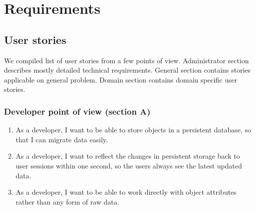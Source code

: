 \chapter{Requirements}
\section{User stories}
We compiled list of user stories from a few points of view. Administrator section describes mostly detailed technical requirements. General section contains stories applicable on general problem. Domain section contains domain specific user stories.

\subsection{Developer point of view (section A)}
\begin{enumerate}
  \item As a developer, I want to be able to store objects in a persistent database, so that I can migrate data easily.
  \item As a developer, I want to reflect the changes in persistent storage back to user sessions within one second, so the users always see the latest updated data.
  \item As a developer, I want to be able to work directly with object attributes rather than any form of raw data.
\end{enumerate}

